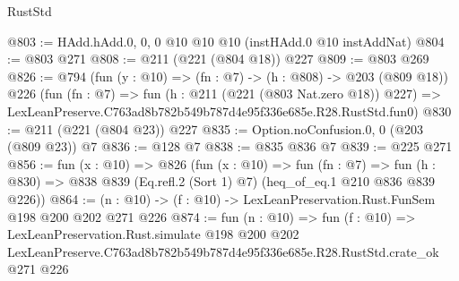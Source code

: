 \begin{lexlean}{RustStd}
\begin{coremodule}
@803 := HAdd.hAdd.{0, 0, 0} @10 @10 @10 (instHAdd.{0} @10 instAddNat)
@804 := @803 @271
@808 := @211 (@221 (@804 @18)) @227
@809 := @803 @269
@826 := @794
    (fun (y : @10) => (fn : @7) -> (h : @808) -> @203 (@809 @18))
    @226
    (fun (fn : @7) =>
    fun (h : @211 (@221 (@803 Nat.zero @18)) @227) =>
    LexLeanPreserve.C763ad8b782b549b787d4e95f336e685e.R28.RustStd.fun0)
@830 := @211 (@221 (@804 @23)) @227
@835 := Option.noConfusion.{0, 0} (@203 (@809 @23)) @7
@836 := @128 @7
@838 := @835 @836 @7
@839 := @225 @271
@856 := fun (x : @10) =>
  @826
    (fun (x : @10) =>
    fun (fn : @7) =>
    fun (h : @830) => @838 @839 (Eq.refl.{2} (Sort 1) @7) (heq_of_eq.{1} @210 @836 @839 @226))
@864 := (n : @10) -> (f : @10) -> LexLeanPreservation.Rust.FunSem @198 @200 @202 @271 @226
@874 := fun (n : @10) =>
  fun (f : @10) =>
  LexLeanPreservation.Rust.simulate
    @198
    @200
    @202
    LexLeanPreserve.C763ad8b782b549b787d4e95f336e685e.R28.RustStd.crate_ok
    @271
    @226
\end{coremodule}
\end{lexlean}
